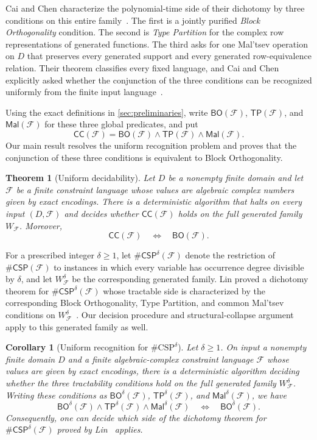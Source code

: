 \documentclass[11pt]{article}
\theoremstyle{plain}
\newtheorem{theorem}{Theorem}[section]
\newtheorem{corollary}[corollary]{Corollary}
\theoremstyle{definition}
\theoremstyle{remark}
\newcommand{\cF}{\mathcal F}
\newcommand{\CC}{\mathsf{CC}}
\newcommand{\BO}{\mathsf{BO}}
\newcommand{\TP}{\mathsf{TP}}
\newcommand{\Mal}{\mathsf{Mal}}
\newcommand{\CSP}[1]{\mathsf{\#CSP}(#1)}
\newcommand{\CSPdeg}[2]{\mathsf{\#CSP}^{#1}(#2)}
\newcommand{\WFdeg}[1]{W_{\cF}^{#1}}
\begin{document}
Cai and Chen characterize the polynomial-time side of their dichotomy by
three conditions on this entire family~\cite[Theorem~1 and
Section~3.1]{CaiChen2017}.  The first is a jointly purified
\emph{Block Orthogonality} condition.  The second is \emph{Type Partition}
for the complex row representations of generated functions.  The third asks
for one Mal'tsev operation on $D$ that preserves every generated support and
every generated row-equivalence relation.  Their theorem classifies every
fixed language, and Cai and Chen explicitly asked whether the conjunction of
the three conditions can be recognized uniformly from the finite input
language~\cite[Section~9]{CaiChen2017}.

Using the exact definitions in \cref{sec:preliminaries}, write
$\BO(\cF)$, $\TP(\cF)$, and $\Mal(\cF)$ for these three global predicates,
and put
\[
  \CC(\cF)=\BO(\cF)\wedge\TP(\cF)\wedge\Mal(\cF).
\]
Our main result resolves the uniform recognition problem and proves that the
conjunction of these three conditions is equivalent to Block Orthogonality.

\begin{theorem}[Uniform decidability]
\label{thm:main}
Let $D$ be a nonempty finite domain and let $\cF$ be a finite
constraint language whose values are algebraic complex numbers given by
exact encodings.  There is a deterministic algorithm that halts on every
input $(D,\cF)$ and decides whether $\CC(\cF)$ holds on the full generated
family $W_{\cF}$.  Moreover,
\begin{equation}
  \CC(\cF)\quad\Longleftrightarrow\quad\BO(\cF).
  \label{eq:main-equivalence}
\end{equation}
\end{theorem}

For a prescribed integer $\delta\ge1$, let
$\CSPdeg{\delta}{\cF}$ denote the restriction of $\CSP{\cF}$ to instances in
which every variable has occurrence degree divisible by $\delta$, and let
$\WFdeg{\delta}$ be the corresponding generated family.  Lin proved a
dichotomy theorem for $\CSPdeg{\delta}{\cF}$ whose tractable side is
characterized by the corresponding Block Orthogonality, Type Partition, and
common Mal'tsev conditions on $\WFdeg{\delta}$~\cite[Theorem~3]{Lin2021}.
Our decision procedure and structural-collapse argument apply to this
generated family as well.

\begin{corollary}[Uniform recognition for $\#\mathrm{CSP}^{\delta}$]
\label{cor:degree-multiple-main}
Let $\delta\ge1$.  On input a nonempty finite domain $D$ and a finite
algebraic-complex constraint language $\cF$ whose values are given by exact
encodings, there is a deterministic algorithm deciding whether the three
tractability conditions hold on the full generated family
$\WFdeg{\delta}$.  Writing these conditions as
$\BO^\delta(\cF)$, $\TP^\delta(\cF)$, and $\Mal^\delta(\cF)$, we have
\[
  \BO^\delta(\cF)\wedge\TP^\delta(\cF)\wedge\Mal^\delta(\cF)
  \quad\Longleftrightarrow\quad
  \BO^\delta(\cF).
\]
Consequently, one can decide which side of the dichotomy theorem for
$\CSPdeg{\delta}{\cF}$ proved by Lin~\cite[Theorem~3]{Lin2021} applies.
\end{corollary}
\end{document}

